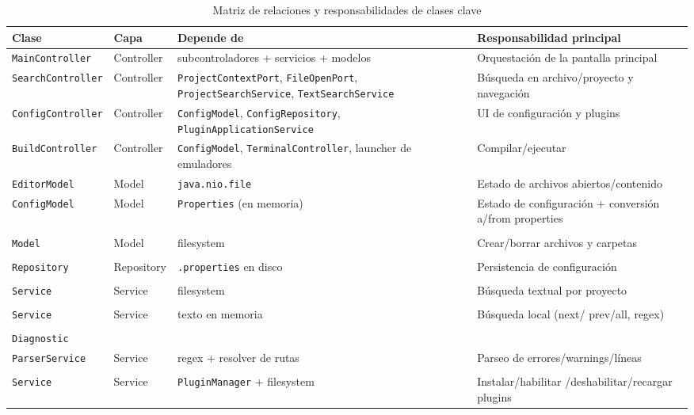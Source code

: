\documentclass[../main.tex]{subfiles}
\begin{document}
\begin{table}[!htb]
\centering
\small
\begin{tabularx}{\textwidth}{|p{3.7cm}|p{2cm}|X|X|}
\hline
\textbf{Clase} & \textbf{Capa} & \textbf{Depende de} & \textbf{Responsabilidad principal} \\
\hline
  \lstinline|MainController| & Controller & subcontroladores + servicios + modelos & Orquestación de la pantalla principal \\
  \hline
  \lstinline|SearchController| & Controller & \lstinline|ProjectContextPort|, \lstinline|FileOpenPort|, \lstinline|ProjectSearchService|, \lstinline|TextSearchService| & Búsqueda en archivo/proyecto y navegación \\
  \hline
  \lstinline|ConfigController| & Controller & \lstinline|ConfigModel|, \lstinline|ConfigRepository|, \lstinline|PluginApplicationService| & UI de configuración y plugins \\
  \hline
  \lstinline|BuildController| & Controller & \lstinline|ConfigModel|, \lstinline|TerminalController|, launcher de emuladores & Compilar/ejecutar \\
  \hline
  \lstinline|EditorModel| & Model & \lstinline|java.nio.file| & Estado de archivos abiertos/contenido \\
  \hline
  \lstinline|ConfigModel| & Model & \lstinline|Properties| (en memoria) & Estado de configuración + conversión a/from properties \\
  \hline
    \makecell{\lstinline|ProjectExplorer|\\\lstinline|Model|} & Model & filesystem & Crear/borrar archivos y carpetas \\
  \hline
  \makecell{\lstinline|PropertiesConfig|\\\lstinline|Repository|} & Repository & \lstinline|.properties| en disco & Persistencia de configuración \\
  \hline
  \makecell{\lstinline|ProjectSearch|\\\lstinline|Service|} & Service & filesystem & Búsqueda textual por proyecto \\
  \hline
  \makecell{\lstinline|TextSearch|\\\lstinline|Service|} & Service & texto en memoria & Búsqueda local (next/ prev/all, regex) \\
  \hline
  \makecell{\lstinline|Compilation|\\\lstinline|Diagnostic|\\\lstinline|ParserService|}& Service & regex + resolver de rutas & Parseo de errores/warnings/líneas \\
  \hline
  \makecell{\lstinline|PluginApplication|\\\lstinline|Service|} & Service & \lstinline|PluginManager| + filesystem & Instalar/habilitar /deshabilitar/recargar plugins \\
  \hline
  \end{tabularx} 
\caption{Matriz de relaciones y responsabilidades de clases clave}
\label{tab:matriz_relaciones_clave}
\end{table} 
\end{document}
